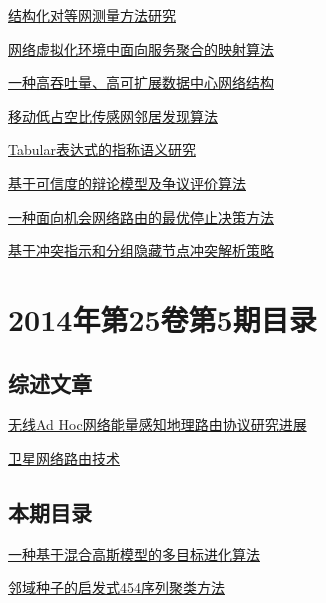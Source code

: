 \documentclass[a4paper]{article}
\begin{document}
\href{http://www.jos.org.cn/ch/reader/download_pdf.aspx?file_no=4435&year_id=2014&quarter_id=6&falg=1}{结构化对等网测量方法研究}

\href{http://www.jos.org.cn/ch/reader/download_pdf.aspx?file_no=4442&year_id=2014&quarter_id=6&falg=1}{网络虚拟化环境中面向服务聚合的映射算法}

\href{http://www.jos.org.cn/ch/reader/download_pdf.aspx?file_no=4444&year_id=2014&quarter_id=6&falg=1}{一种高吞吐量、高可扩展数据中心网络结构}

\href{http://www.jos.org.cn/ch/reader/download_pdf.aspx?file_no=4493&year_id=2014&quarter_id=6&falg=1}{移动低占空比传感网邻居发现算法}

\href{http://www.jos.org.cn/ch/reader/download_pdf.aspx?file_no=4515&year_id=2014&quarter_id=6&falg=1}{Tabular表达式的指称语义研究}

\href{http://www.jos.org.cn/ch/reader/download_pdf.aspx?file_no=4446&year_id=2014&quarter_id=6&falg=1}{基于可信度的辩论模型及争议评价算法}

\href{http://www.jos.org.cn/ch/reader/download_pdf.aspx?file_no=4434&year_id=2014&quarter_id=6&falg=1}{一种面向机会网络路由的最优停止决策方法}

\href{http://www.jos.org.cn/ch/reader/download_pdf.aspx?file_no=4437&year_id=2014&quarter_id=6&falg=1}{基于冲突指示和分组隐藏节点冲突解析策略}


\section{\textbf{2014年第25卷第5期目录}}
\subsection{综述文章}
\href{http://www.jos.org.cn/ch/reader/download_pdf.aspx?file_no=4579&year_id=2014&quarter_id=5&falg=1}{无线Ad Hoc网络能量感知地理路由协议研究进展}

\href{http://www.jos.org.cn/ch/reader/download_pdf.aspx?file_no=4581&year_id=2014&quarter_id=5&falg=1}{卫星网络路由技术}

\subsection{本期目录}
\href{http://www.jos.org.cn/ch/reader/download_pdf.aspx?file_no=4514&year_id=2014&quarter_id=5&falg=1}{一种基于混合高斯模型的多目标进化算法}

\href{http://www.jos.org.cn/ch/reader/download_pdf.aspx?file_no=4547&year_id=2014&quarter_id=5&falg=1}{邻域种子的启发式454序列聚类方法}
\end{document}
